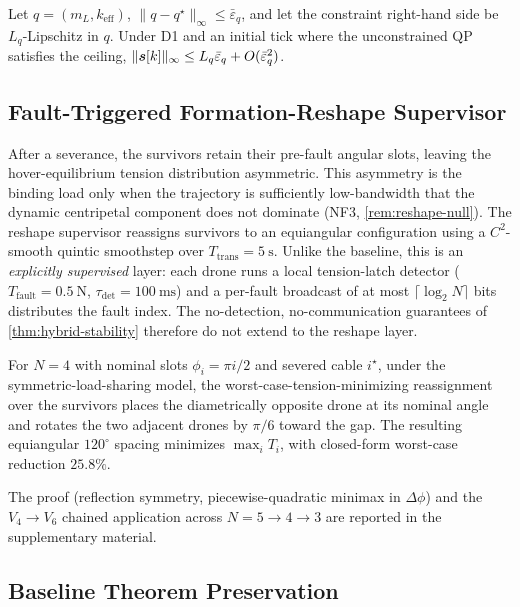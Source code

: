 \begin{proposition}
\label{prop:mpc-slack}
Let $q=(m_L,k_{\mathrm{eff}})$, $\|q-q^\star\|_\infty\le\bar\varepsilon_q$, and let the constraint right-hand side be $L_q$-Lipschitz in $q$. Under D1 and an initial tick where the unconstrained QP satisfies the ceiling, $\|\boldsymbol{s}[k]\|_\infty\le L_q\bar\varepsilon_q + O(\bar\varepsilon_q^2)$.
\end{proposition}

\subsection{Fault-Triggered Formation-Reshape Supervisor}
\label{sec:reshape-supervisor}

After a severance, the survivors retain their pre-fault angular slots, leaving the hover-equilibrium tension distribution asymmetric. This asymmetry is the binding load only when the trajectory is sufficiently low-bandwidth that the dynamic centripetal component does not dominate (NF3, \cref{rem:reshape-null}). The reshape supervisor reassigns survivors to an equiangular configuration using a $ C^2$-smooth quintic smoothstep over $T_{\mathrm{trans}}=\SI{5}{\second}$. Unlike the baseline, this is an \emph{explicitly supervised} layer: each drone runs a local tension-latch detector ($T_{\mathrm{fault}}=\SI{0.5}{\newton}$, $\tau_{\mathrm{det}}=\SI{100}{\milli\second}$) and a per-fault broadcast of at most $\lceil\log_2 N\rceil$ bits distributes the fault index. The no-detection, no-communication guarantees of \cref{thm:hybrid-stability} therefore do not extend to the reshape layer.

\begin{theorem}[Globally tension-optimal reshape, $N=4$]
\label{thm:reshape}
For $N=4$ with nominal slots $\phi_i=\pi i/2$ and severed cable $i^\star$, under the symmetric-load-sharing model, the worst-case-tension-minimizing reassignment over the survivors places the diametrically opposite drone at its nominal angle and rotates the two adjacent drones by $\pi/6$ toward the gap. The resulting equiangular $120^\circ$ spacing minimizes $\max_i T_i$, with closed-form worst-case reduction $25.8\%$.
\end{theorem}

The proof (reflection symmetry, piecewise-quadratic minimax in $\Delta\phi$) and the $V_4\to V_6$ chained application across $N=5\to 4\to 3$ are reported in the supplementary material.

\subsection{Baseline Theorem Preservation}
\label{sec:theorem-preservation}

